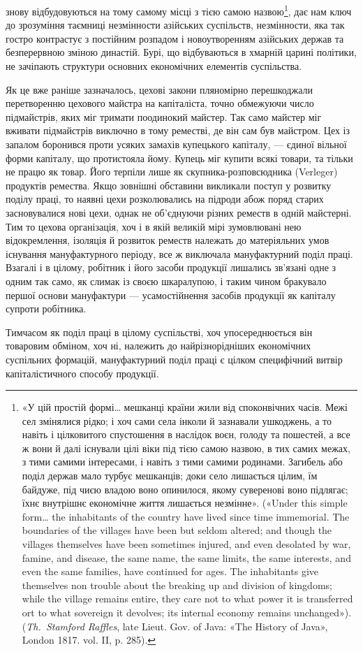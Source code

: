 \parcont{}  %
знову відбудовуються на тому самому місці з тією самою назвою\footnote{
«У цій простій формі\dots{} мешканці країни жили від споконвічних
часів. Межі сел змінялися рідко; і хоч сами села інколи й зазнавали
ушкоджень, а то навіть і цілковитого спустошення в наслідок воєн,
голоду та пошестей, а все ж вони й далі існували цілі віки під тією самою
назвою, в тих самих межах, з тими самими інтересами, і навіть з тими
самими родинами. Загибель або поділ держав мало турбує мешканців;
доки село лишається цілим, їм байдуже, під чиєю владою воно опинилося,
якому суверенові воно підлягає; їхнє внутрішнє економічне життя
лишається незмінне». («Under this simple form\dots{} the inhabitants of the
country have lived since time immemorial. The boundaries of the villages
have been but seldom altered; and though the villages themselves have
been sometimes injured, and even desolated by war, famine, and disease,
the same name, the same limits, the same interests, and even the same
families, have continued for ages. The inhabitants give themselves non
trouble about the breaking up and division of kingdoms; while the village
remains entire, they care not to what power it is transferred ort to what
sovereign it devolves; its internal economy remains unchanged»). (\emph{Th.~Stamford
Raffles}, late Lieut. Gov. of Java: «The History of Java», London 1817.
vol. II, p. 285).
}, дає нам ключ до зрозуміння таємниці незмінности азійських
суспільств, незмінности, яка так гостро контрастує з постійним
розпадом і новоутворенням азійських держав та безперервною
зміною династій. Бурі, що відбуваються в хмарній царині політики,
не зачіпають структури основних економічних елементів
суспільства.

Як це вже раніше зазначалось, цехові закони пляномірно
перешкоджали перетворенню цехового майстра на капіталіста,
точно обмежуючи число підмайстрів, яких міг тримати поодинокий
майстер. Так само майстер міг вживати підмайстрів виключно
в тому реместві, де він сам був майстром. Цех із запалом
боронився проти усяких замахів купецького капіталу, —
єдиної вільної форми капіталу, що протистояла йому. Купець
міг купити всякі товари, та тільки не працю як товар. Його терпіли
лише як скупника-розповсюдника (Verleger) продуктів
ремества. Якщо зовнішні обставини викликали поступ у розвитку
поділу праці, то наявні цехи розколювались на підроди абож
поряд старих засновувалися нові цехи, однак не об’єднуючи різних
реместв в одній майстерні. Тим то цехова організація, хоч і в
якій великій мірі зумовлювані нею відокремлення, ізоляція й
розвиток реместв належать до матеріяльних умов існування
мануфактурного періоду, все ж виключала мануфактурний поділ
праці. Взагалі і в цілому, робітник і його засоби продукції
лишались зв’язані одне з одним так само, як слимак із своєю
шкаралупою, і таким чином бракувало першої основи мануфактури
— усамостійнення засобів продукції як капіталу супроти
робітника.

Тимчасом як поділ праці в цілому суспільстві, хоч упосереднюється
він товаровим обміном, хоч ні, належить до найрізнорідніших
економічних суспільних формацій, мануфактурний
поділ праці є цілком специфічний витвір капіталістичного способу
продукції.
